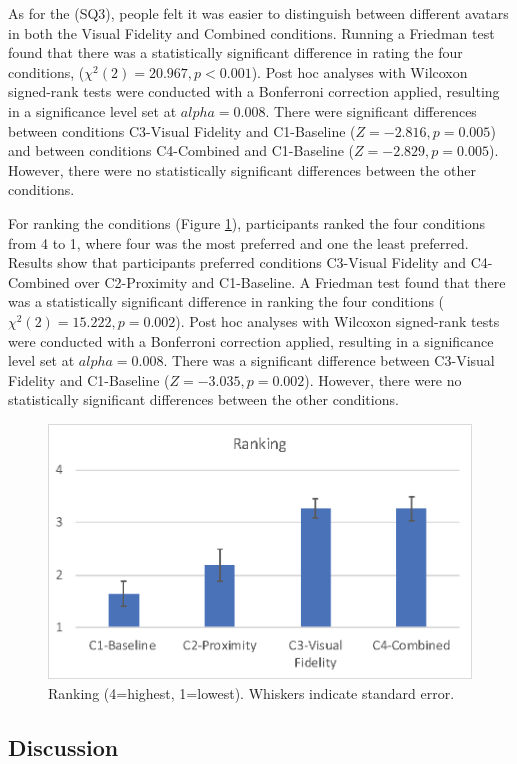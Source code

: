 As for the (SQ3), people felt it was easier to distinguish between different avatars in both the Visual Fidelity and Combined conditions. Running a Friedman test found that there was a statistically significant difference in rating the four conditions, ($\chi^2(2)=20.967,p<0.001$). Post hoc analyses with Wilcoxon signed-rank tests were conducted with a Bonferroni correction applied, resulting in a significance level set at $alpha=0.008$. There were significant differences between conditions C3-Visual Fidelity and C1-Baseline ($Z=-2.816, p=0.005$) and between conditions C4-Combined and C1-Baseline ($Z=-2.829, p=0.005$). However, there were no statistically significant differences between the other conditions.


For ranking the conditions (Figure \ref{fig:contacts:ranking}), participants ranked the four conditions from 4 to 1, where four was the most preferred and one the least preferred. Results show that participants preferred conditions C3-Visual Fidelity and C4-Combined over C2-Proximity and C1-Baseline. A Friedman test found that there was a statistically significant difference in ranking the four conditions ($\chi^2(2)=15.222,p=0.002$). Post hoc analyses with Wilcoxon signed-rank tests were conducted with a Bonferroni correction applied, resulting in a significance level set at $alpha=0.008$. There was a significant difference between C3-Visual Fidelity and C1-Baseline ($Z=-3.035, p=0.002$). However, there were no statistically significant differences between the other conditions.

\begin{figure}[ht]
    \centering
    \includegraphics[width=0.8\linewidth]{images/41-visualising-mgia17/analysis-images-04.eps}
    \caption{Ranking (4=highest, 1=lowest). Whiskers indicate standard error.}
    \label{fig:contacts:ranking}
\end{figure}

\subsection{Discussion}

